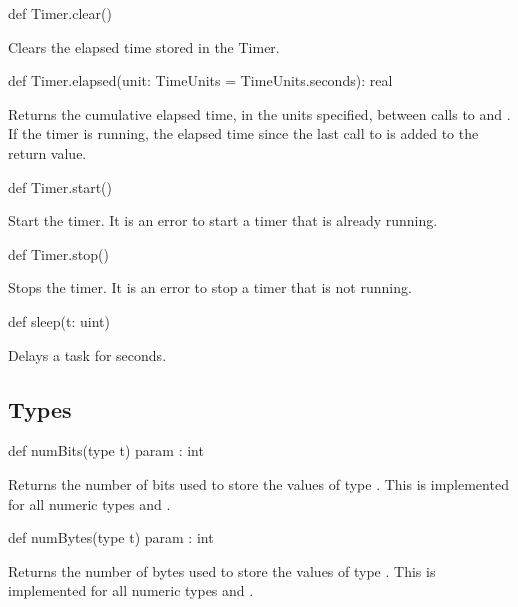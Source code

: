 \begin{protohead}
def Timer.clear()
\end{protohead}
\begin{protobody}
Clears the elapsed time stored in the Timer.
\end{protobody}

\begin{protohead}
def Timer.elapsed(unit: TimeUnits = TimeUnits.seconds): real
\end{protohead}
\begin{protobody}
Returns the cumulative elapsed time, in the units specified, between
calls to  and .  If the timer is running, the
elapsed time since the last call to  is added to the
return value.
\end{protobody}

\begin{protohead}
def Timer.start()
\end{protohead}
\begin{protobody}
Start the timer.  It is an error to start a timer that is already
running.
\end{protobody}

\begin{protohead}
def Timer.stop()
\end{protohead}
\begin{protobody}
Stops the timer.  It is an error to stop a timer that is not running.
\end{protobody}

\begin{protohead}
def sleep(t: uint)
\end{protohead}
\begin{protobody}
Delays a task for  seconds.
\end{protobody}

\subsection{Types}

\begin{protohead}
def numBits(type t) param : int
\end{protohead}
\begin{protobody}
Returns the number of bits used to store the values of type .
This is implemented for all numeric types and .
\end{protobody}


\begin{protohead}
def numBytes(type t) param : int
\end{protohead}
\begin{protobody}
Returns the number of bytes used to store the values of type .
This is implemented for all numeric types and .
\end{protobody}

